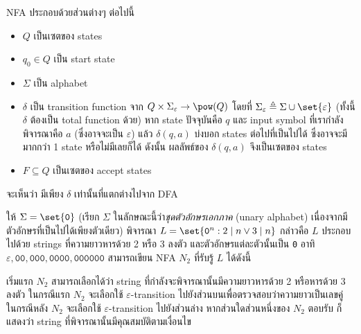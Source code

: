 \begin{definition}
NFA ประกอบด้วยส่วนต่างๆ ต่อไปนี้
\begin{itemize}
\item $Q$ เป็นเซตของ states
\item $q_0\in Q$ เป็น start state
\item $\Sigma$ เป็น alphabet
\item $\delta$ เป็น transition function จาก $Q\times\Sigma_\varepsilon\to\pow(Q)$ โดยที่ $\Sigma_\varepsilon\triangleq\Sigma\cup\set{\varepsilon}$ (ทั้งนี้ $\delta$ ต้องเป็น total function ด้วย) \enskip หาก state ปัจจุบันคือ $q$ และ input symbol ที่เรากำลังพิจารณาคือ $a$ (ซึ่งอาจจะเป็น $\varepsilon$) แล้ว $\delta(q,a)$ บ่งบอก states ต่อไปที่เป็นไปได้ ซึ่งอาจจะมีมากกว่า 1 state หรือไม่มีเลยก็ได้ ดังนั้น ผลลัพธ์ของ $\delta(q,a)$ จึงเป็นเซตของ states
\item $F\subseteq Q$ เป็นเซตของ accept states
\end{itemize}
จะเห็นว่า มีเพียง $\delta$ เท่านั้นที่แตกต่างไปจาก DFA
\end{definition}
%
\begin{example}
ให้ $\Sigma=\set{\texttt{0}}$ (เรียก $\Sigma$ ในลักษณะนี้ว่า\emph{ชุดตัวอักษรเอกภาค} (unary alphabet) เนื่องจากมีตัวอักษรที่เป็นไปได้เพียงตัวเดียว) \enskip พิจารณา $L=\set{\texttt{0}^n:2\mid n\vee 3\mid n}$ กล่าวคือ $L$ ประกอบไปด้วย strings ที่ความยาวหารด้วย 2 หรือ 3 ลงตัว และตัวอักษรแต่ละตัวนั้นเป็น \texttt{0} อาทิ $\varepsilon,\texttt{00},\texttt{000},\texttt{0000},\texttt{000000}$ \enskip สามารถเขียน NFA $N_2$ ที่รับรู้ $L$ ได้ดังนี้
\begin{center}
\end{center}
เริ่มแรก $N_2$ สามารถเลือกได้ว่า string ที่กำลังจะพิจารณานั้นมีความยาวหารด้วย 2 หรือหารด้วย 3 ลงตัว \enskip ในกรณีแรก $N_2$ จะเลือกใช้ $\varepsilon$-transition ไปยังส่วนบนเพื่อตรวจสอบว่าความยาวเป็นเลขคู่ \enskip ในกรณีหลัง $N_2$ จะเลือกใช้ $\varepsilon$-transition ไปยังส่วนล่าง \enskip หากส่วนใดส่วนหนึ่งของ $N_2$ ตอบรับ ก็แสดงว่า string ที่พิจารณานั้นมีคุณสมบัติตามเงื่อนไข
\end{example}


